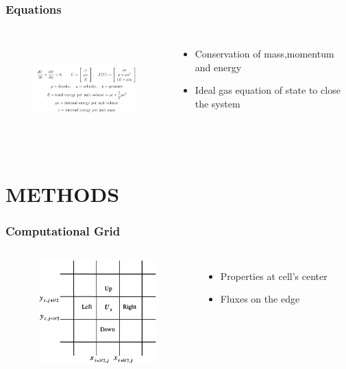 \documentclass{beamer}
\begin{document}
    \begin{frame}
        \frametitle{Equations}
        \begin{columns}
        \begin{figure}
            \includegraphics[height = 40mm,width = 50mm]{euler1d.jpg}
        \end{figure}

        \begin{itemize}
            \item Conservation of mass,momentum and energy
            \item Ideal gas equation of state to close the system 
        \end{itemize}
        \end{columns}        
    \end{frame}

    

    \section{METHODS}
    \begin{frame}
        \frametitle{Computational Grid}
        \begin{columns}
            \begin{figure}
                \includegraphics[height = 40mm,width = 50mm]{grid.png}
            \end{figure}   
    
            \begin{itemize}
                \item Properties at cell's center 
                \item Fluxes on the edge
            \end{itemize}
            \end{columns}        
    \end{frame}
\end{document}
